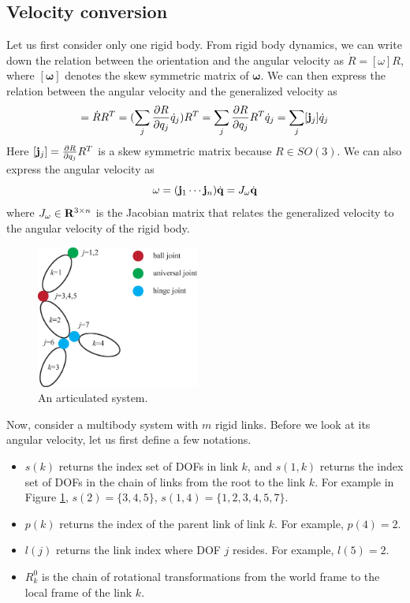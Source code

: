 \subsection{Velocity conversion}
Let us first consider only one rigid body. From rigid body dynamics,
we can write down the relation between the orientation and the angular
velocity as $\dot{R} = [\omega] R$, where $[\boldsymbol{\omega}]$
denotes the skew symmetric matrix of $\boldsymbol{\omega}$. We can
then express the relation between the angular velocity and the
generalized velocity as
\begin{equation}
[\omega] = \dot{R} R^{T} = (\sum_j \frac{\partial R}{\partial q_j}
\dot{q}_j) R^T = \sum_j\frac{\partial R}{\partial q_j} R^T
\dot{q}_j = \sum_j [\vc{j}_j] \dot{q}_j
\end{equation}
Here $[\mathbf{j}_j] = \frac{\partial R}{\partial q_j} R^T$ is a skew
symmetric matrix because $R \in SO(3)$. We can also express the
angular velocity as
\begin{equation}
\omega = ( \mathbf{j}_1 \cdots \mathbf{j}_n) \dot{\mathbf{q}} = J_{\omega} \dot{\mathbf{q}}
\end{equation}
where $ J_{\omega} \in \mathbf{R}^{3 \times n}$ is the Jacobian matrix
that relates the generalized velocity to the angular velocity of the
rigid body.
 
\begin{figure}
 \vspace{-10pt}
\begin{center}
\includegraphics[width=2.1in]{example1.eps}
\end{center}
\caption{An articulated system.}
 \vspace{-20pt}
\label{fig:example1}
\end{figure}

Now, consider a multibody system with $m$ rigid links. Before we look
at its angular velocity, let us first define a few notations.
\begin{itemize}
\item $s(k)$ returns the index set of DOFs in link $k$, and $s(1, k)$
  returns the index set of DOFs in the chain of links from the root to
  the link $k$. For example in Figure \ref{fig:example1}, $s(2) = \{3, 4, 5\}$, $s(1, 4) = \{1, 2, 3,
    4, 5, 7\}$.
\item $p(k)$ returns the index of the parent link of link $k$. For
  example, $p(4) = 2$.
\item $l(j)$ returns the link index where DOF $j$ resides. For
  example, $l(5) = 2$.
\item $R^0_k$ is the chain of rotational transformations from the
  world frame to the local frame of the link $k$.
\end{itemize}

